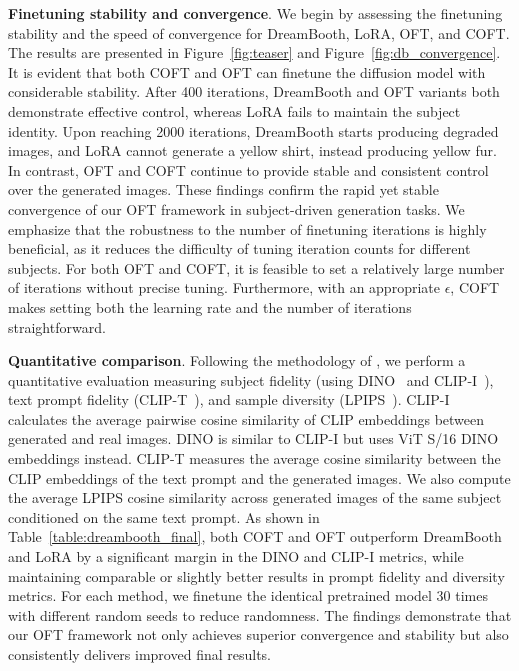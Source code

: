 \textbf{Finetuning stability and convergence}. We begin by assessing the finetuning stability and the speed of convergence for DreamBooth, LoRA, OFT, and COFT. The results are presented in Figure~\ref{fig:teaser} and Figure~\ref{fig:db_convergence}. It is evident that both COFT and OFT can finetune the diffusion model with considerable stability. After 400 iterations, DreamBooth and OFT variants both demonstrate effective control, whereas LoRA fails to maintain the subject identity. Upon reaching 2000 iterations, DreamBooth starts producing degraded images, and LoRA cannot generate a yellow shirt, instead producing yellow fur. In contrast, OFT and COFT continue to provide stable and consistent control over the generated images. These findings confirm the rapid yet stable convergence of our OFT framework in subject-driven generation tasks. We emphasize that the robustness to the number of finetuning iterations is highly beneficial, as it reduces the difficulty of tuning iteration counts for different subjects. For both OFT and COFT, it is feasible to set a relatively large number of iterations without precise tuning. Furthermore, with an appropriate $\epsilon$, COFT makes setting both the learning rate and the number of iterations straightforward.

\textbf{Quantitative comparison}. Following the methodology of \cite{ruiz2023dreambooth}, we perform a quantitative evaluation measuring subject fidelity (using DINO~\cite{caron2021emerging} and CLIP-I~\cite{radford2021learning}), text prompt fidelity (CLIP-T~\cite{radford2021learning}), and sample diversity (LPIPS~\cite{zhang2018unreasonable}). CLIP-I calculates the average pairwise cosine similarity of CLIP embeddings between generated and real images. DINO is similar to CLIP-I but uses ViT S/16 DINO embeddings instead. CLIP-T measures the average cosine similarity between the CLIP embeddings of the text prompt and the generated images. We also compute the average LPIPS cosine similarity across generated images of the same subject conditioned on the same text prompt. As shown in Table~\ref{table:dreambooth_final}, both COFT and OFT outperform DreamBooth and LoRA by a significant margin in the DINO and CLIP-I metrics, while maintaining comparable or slightly better results in prompt fidelity and diversity metrics. For each method, we finetune the identical pretrained model 30 times with different random seeds to reduce randomness. The findings demonstrate that our OFT framework not only achieves superior convergence and stability but also consistently delivers improved final results.

